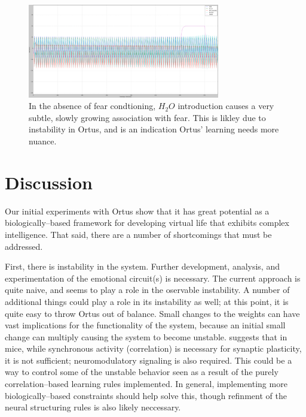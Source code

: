 \documentclass[letterpaper]{article}
\begin{document}
\begin{figure}
\begin{center}
\includegraphics[width=3.3in]{images/no_conditioning_small.png}
\caption{In the absence of fear condtioning, $H_2O$ introduction causes a very subtle, slowly growing association with fear. This is likley due to instability in Ortus, and is an indication Ortus' learning needs more nuance.}
\label{no_conditioning}
\end{center}
\end{figure}






\section{Discussion}


Our initial experiments with Ortus show that it has great potential as a biologically--based framework for developing virtual life that exhibits complex intelligence. That said, there are a number of shortcomings that must be addressed.

First, there is instability in the system. Further development, analysis, and experimentation of the emotional circuit(s) is necessary. The current approach is quite naive, and seems to play a role in the oservable instability. A number of additional things could play a role in its instability as well; at this point, it is quite easy to throw Ortus out of balance. Small changes to the weights can have vast implications for the functionality of the system, because an initial small change can multiply causing the system to become unstable. \citet{Johansen2014} suggests that in mice, while synchronous activity (correlation) is necessary for synaptic plasticity, it is not sufficient; neuromodulatory signaling is also required. This could be a way to control some of the unstable behavior seen as a result of the purely correlation--based learning rules implemented. In general, implementing more biologically--based constraints should help solve this, though refinment of the neural structuring rules is also likely neccessary.
\end{document}
